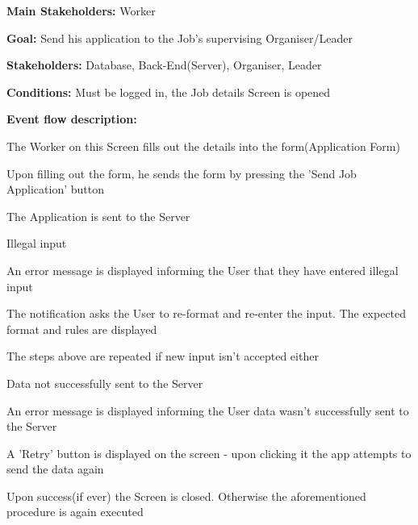 				\noindent {}
				\begin{packed_item}
					\item \textbf{Main Stakeholders:} Worker
					\item \textbf{Goal:} Send his application to the Job's supervising Organiser/Leader
					\item \textbf{Stakeholders: } Database, Back-End(Server), Organiser, Leader
					\item \textbf{Conditions: } Must be logged in, the Job details Screen is opened
					\item \textbf{Event flow description: }
					\begin{packed_enum}
						\item The Worker on this Screen fills out the details into the form(Application Form)
						\item Upon filling out the form, he sends the form by pressing the 'Send Job Application' button
						\item The Application is sent to the Server
					\end{packed_enum}
					
					\begin{packed_item}
						\item[1.a] Illegal input
						\item[] \begin{packed_enum}
							\item An error message is displayed informing the User that they have entered illegal input
							\item The notification asks the User to re-format and re-enter the input. The expected format and rules are displayed
							\item The steps above are repeated if new input isn't accepted either
						\end{packed_enum}
						
						\item[3.a] Data not successfully sent to the Server
						\item[] \begin{packed_enum}
							\item An error message is displayed informing the User data wasn't successfully sent to the Server
							\item A 'Retry' button is displayed on the screen - upon clicking it the app attempts to send the data again
							\item Upon success(if ever) the Screen is closed. Otherwise the aforementioned procedure is again executed
						\end{packed_enum}
					\end{packed_item}
				\end{packed_item}
			
